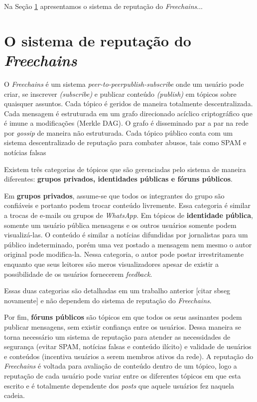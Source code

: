 \documentclass[12pt]{article}
\newcommand{\FC} {\emph{Freechains}\xspace}
\newcommand{\PtoP} {\emph{peer-to-peer}\xspace}
\begin{document}
Na Seção \ref{sec:freechains} apresentamos o sistema de reputação do \FC...

\section{O sistema de reputação do \FC} \label{sec:freechains}

O \FC é um sistema \PtoP \emph{publish-subscribe} onde um usuário pode criar, se inscrever \emph{(subscribe)} e publicar conteúdo \emph{(publish)} em tópicos sobre quaisquer assuntos.  
Cada tópico é geridos de maneira totalmente descentralizada.
Cada mensagem é estruturada em um grafo direcionado acíclico criptográfico que é imune a modificações (Merkle DAG). 
O grafo é disseminado par a par na rede por \emph{gossip} de maneira não estruturada.
Cada tópico público conta com um sistema descentralizado de
reputação para combater abusos, tais como SPAM e notícias falsas

Existem três categorias de tópicos que são gerenciadas pelo sistema de maneira diferentes: \textbf{grupos privados, identidades públicas e fóruns públicos}. 

Em \textbf{grupos privados}, assume-se que todos os integrantes do grupo são confiáveis e portanto podem trocar conteúdo livremente.  Essa categoria é similar a trocas de e-mails ou grupos de \emph{WhatsApp}.
Em tópicos de \textbf{identidade pública}, somente um usuário pública mensagens e os outros usuários somente podem visualizá-las.
O conteúdo é similar a notícias difundidas por jornalistas para um público indeterminado, porém uma vez postado a mensagem nem mesmo o autor original pode modifica-la.
Nessa categoria, o autor pode postar irrestritamente enquanto que seus leitores são meros visualizadores apesar de existir a possibilidade de os usuários fornecerem \emph{feedback}.

Essas duas categorias são detalhadas em um trabalho anterior [citar sbseg novamente] e não dependem do sistema de reputação do \FC.

Por fim, \textbf{fóruns públicos} são tópicos em que todos os seus assinantes podem publicar mensagens, sem existir confiança entre os usuários.
Dessa maneira se torna necessário um sistema de reputação para atender as necessidades de segurança (evitar SPAM, notícias falsas e conteúdo ilícito) e validade de usuários e conteúdos (incentiva usuários a serem membros ativos da rede).
A reputação do \FC é voltada para avaliação de conteúdo dentro de um tópico, logo a reputação de cada usuário pode variar entre os diferentes tópicos em que esta escrito e é totalmente dependente dos \emph{posts} que aquele usuários fez naquela cadeia. 
\end{document}

